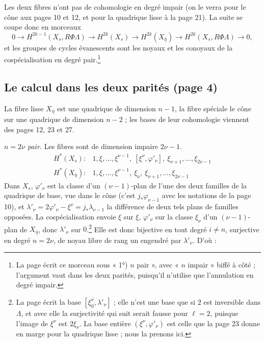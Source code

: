 \documentclass[11pt,a4paper]{article}
\begin{document}
Les deux fibres n'ont pas de cohomologie en degré impair (on le verra pour
le cône aux pages 10 et 12, et pour la quadrique lisse à la page 21). La
suite se coupe donc en morceaux
\[
  0 \to H^{2k-1}(X_{s}, R\Phi\Lambda) \to H^{2k}(X_{s}) \to H^{2k}(X_{\bar\eta})
  \to H^{2k}(X_{s}, R\Phi\Lambda) \to 0 ,
\]
et les groupes de cycles évanescents sont les noyaux et les conoyaux de la
cospécialisation en degré pair.\footnote{La page écrit ce morceau sous
« 1°) $n$ pair », avec « $n$ impair » biffé à côté ; l'argument
vaut dans les deux parités, puisqu'il n'utilise que l'annulation en degré
impair.}

\subsection*{Le calcul dans les deux parités (page 4)}

La fibre lisse $X_{\bar\eta}$ est une quadrique de dimension $n - 1$, la
fibre spéciale le cône sur une quadrique de dimension $n - 2$ ; les bases
de leur cohomologie viennent des pages 12, 23 et 27.

\emph{$n = 2\nu$ pair.} Les fibres sont de dimension impaire $2\nu - 1$.
\[
  \begin{array}{ll}
    H^{*}(X_{s}) : & 1, \xi, \ldots, \xi^{\nu-1}, \ [\xi^{\nu}, \varphi'_{\nu}], \
      \xi_{\nu+1}, \ldots, \xi_{2\nu-1} \\[4pt]
    H^{*}(X_{\bar\eta}) : & 1, \xi, \ldots, \xi^{\nu-1}, \ \xi_{\nu}, \
      \xi_{\nu+1}, \ldots, \xi_{2\nu-1}
  \end{array}
\]
Dans $X_{s}$, $\varphi'_{\nu}$ est la classe d'un $(\nu-1)$-plan de
l'une des deux familles de la quadrique de base, vue dans le cône (c'est
$j_{*}\varphi_{\nu-1}$ avec les notations de la page 10), et
$\lambda'_{\nu} = 2\varphi'_{\nu} - \xi^{\nu} = j_{*}\lambda_{\nu-1}$ la
différence de deux tels plans de familles opposées. La cospécialisation envoie $\xi$ sur $\xi$,
$\varphi'_{\nu}$ sur la classe $\xi_{\nu}$ d'un $(\nu-1)$-plan de
$X_{\bar\eta}$, donc $\lambda'_{\nu}$ sur $0$.\footnote{La page écrit la
base $[\xi_{0}^{\nu}, \lambda'_{\nu}]$ ; elle n'est une base que si $2$ est
inversible dans $\Lambda$, et avec elle la surjectivité qui suit serait
fausse pour $\ell = 2$, puisque l'image de $\xi^{\nu}$ est $2\xi_{\nu}$. La
base entière $(\xi^{\nu}, \varphi'_{\nu})$ est celle que la page 23 donne en
marge pour la quadrique lisse ; nous la prenons ici.} Elle est donc bijective
en tout degré $i \neq n$, surjective en degré $n = 2\nu$, de noyau libre de
rang un engendré par $\lambda'_{\nu}$. D'où :
\end{document}
